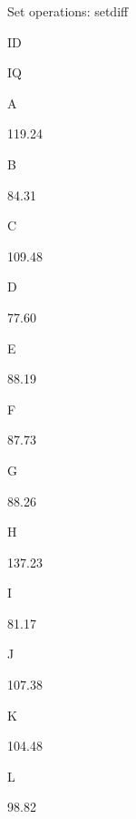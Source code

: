 \documentclass[ignorenonframetext,]{beamer}
\newenvironment{Shaded}{\begin{snugshade}}{\end{snugshade}}
\newcommand{\KeywordTok}[1]{\textcolor[rgb]{0.13,0.29,0.53}{\textbf{#1}}}
\newcommand{\DataTypeTok}[1]{\textcolor[rgb]{0.13,0.29,0.53}{#1}}
\newcommand{\DecValTok}[1]{\textcolor[rgb]{0.00,0.00,0.81}{#1}}
\newcommand{\StringTok}[1]{\textcolor[rgb]{0.31,0.60,0.02}{#1}}
\newcommand{\OperatorTok}[1]{\textcolor[rgb]{0.81,0.36,0.00}{\textbf{#1}}}
\newcommand{\NormalTok}[1]{#1}
\begin{document}
\begin{frame}[fragile]{Set operations: setdiff}

\begin{Shaded}
\end{Shaded}

ID

IQ

A

119.24

B

84.31

C

109.48

D

77.60

E

88.19

F

87.73

G

88.26

H

137.23

I

81.17

J

107.38

K

104.48

L

98.82

\end{frame}
\end{document}
